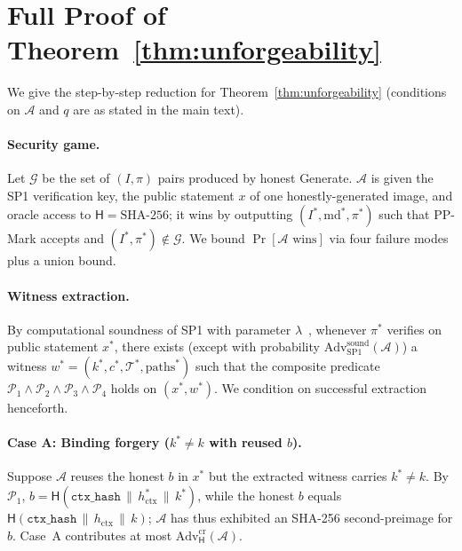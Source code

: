 \documentclass{article}
\theoremstyle{plain}
\theoremstyle{definition}
\theoremstyle{remark}
\begin{document}
\clearpage

\appendix
\section{Full Proof of Theorem~\ref{thm:unforgeability}}\label{app:full-proof}

We give the step-by-step reduction for Theorem~\ref{thm:unforgeability} (conditions on $\mathcal{A}$ and $q$ are as stated in the main text).

\paragraph{Security game.} Let $\mathcal{G}$ be the set of $(I, \pi)$ pairs produced by honest \textsf{Generate}. $\mathcal{A}$ is given the SP1 verification key, the public statement $x$ of one honestly-generated image, and oracle access to $\mathsf{H}=\mathrm{SHA\text{-}256}$; it wins by outputting $(I^*, \mathrm{md}^*, \pi^*)$ such that PP-Mark accepts and $(I^*, \pi^*) \notin \mathcal{G}$. We bound $\Pr[\mathcal{A}\text{ wins}]$ via four failure modes plus a union bound.

\paragraph{Witness extraction.} By computational soundness of SP1 with parameter $\lambda$~\cite{succinct2024sp1}, whenever $\pi^*$ verifies on public statement $x^*$, there exists (except with probability $\mathrm{Adv}^{\mathrm{sound}}_{\mathrm{SP1}}(\mathcal{A})$) a witness $w^* = (k^*, c^*, \mathcal{T}^*, \mathrm{paths}^*)$ such that the composite predicate $\mathcal{P}_1 \wedge \mathcal{P}_2 \wedge \mathcal{P}_3 \wedge \mathcal{P}_4$ holds on $(x^*, w^*)$. We condition on successful extraction henceforth.

\paragraph{Case A: Binding forgery ($k^* \neq k$ with reused $b$).} Suppose $\mathcal{A}$ reuses the honest $b$ in $x^*$ but the extracted witness carries $k^* \neq k$. By $\mathcal{P}_1$, $b = \mathsf{H}(\texttt{ctx\_hash} \,\|\, h_{\mathrm{ctx}}^* \,\|\, k^*)$, while the honest $b$ equals $\mathsf{H}(\texttt{ctx\_hash} \,\|\, h_{\mathrm{ctx}} \,\|\, k)$; $\mathcal{A}$ has thus exhibited an SHA-256 second-preimage for $b$. Case~A contributes at most $\mathrm{Adv}^{\mathrm{cr}}_{\mathsf{H}}(\mathcal{A})$.
\end{document}
